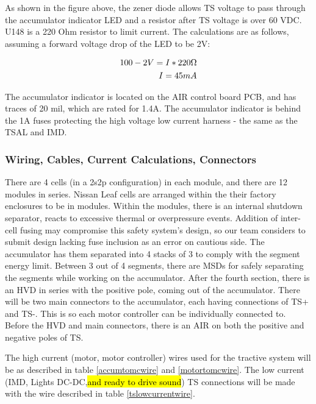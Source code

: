 \documentclass{article}
\DeclareRobustCommand{\hlr}[1]{{\sethlcolor{red}\hl{#1}}}
\begin{document}
              As shown in the figure above, the zener diode allows TS voltage to pass through the accumulator indicator LED and a resistor after TS voltage is over 60 VDC. U148 is a 220 Ohm resistor to limit current. The calculations are as follows, assuming a forward voltage drop of the LED to be 2V:

             \begin{align}
                 100-2 V = I * 220 \ohm \\
                 I = 45 mA
             \end{align}

             The accumulator indicator is located on the AIR control board PCB, and has traces of 20 mil, which are rated for 1.4A. The accumulator indicator is behind the 1A fuses protecting the high voltage low current harness - the same as the TSAL and IMD.

         \subsubsection{Wiring, Cables, Current Calculations, Connectors} \label{batteryconnectors}

                 There are 4 cells (in a 2s2p configuration) in each module, and there are 12 modules in series. Nissan Leaf cells are arranged within the their factory enclosures to be in modules. Within the modules, there is an internal shutdown separator, reacts to excessive thermal or overpressure events. Addition of inter-cell fusing may compromise this safety system’s design, so our team considers to submit design lacking fuse inclusion as an error on cautious side. The accumulator has them separated into 4 stacks of 3 to comply with the segment energy limit. Between 3 out of 4 segments, there are MSDs for safely separating the segments while working on the accumulator. After the fourth section, there is an HVD in series with the positive pole, coming out of the accumulator. There will be two main connectors to the accumulator, each having connections of TS+ and TS-. This is so each motor controller can be individually connected to. Before the HVD and main connectors, there is an AIR on both the positive and negative poles of TS.

             The high current (motor, motor controller) wires used for the tractive system will be as described in table \ref{accumtomcwire} and \ref{motortomcwire}.
             The low current (IMD, Lights DC-DC,\hlr{and ready to drive sound}) TS connections will be made with the wire described in table \ref{tslowcurrentwire}.
\end{document}
